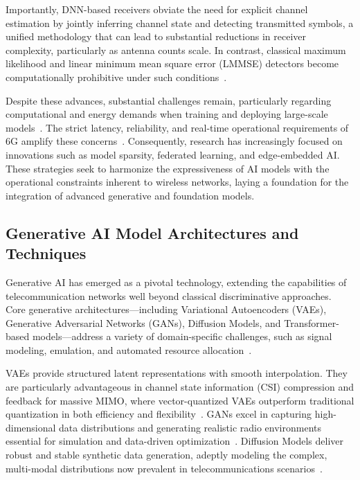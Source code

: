 \documentclass[sigconf]{acmart}
\begin{document}
Importantly, DNN-based receivers obviate the need for explicit channel estimation by jointly inferring channel state and detecting transmitted symbols, a unified methodology that can lead to substantial reductions in receiver complexity, particularly as antenna counts scale. In contrast, classical maximum likelihood and linear minimum mean square error (LMMSE) detectors become computationally prohibitive under such conditions~\cite{ref43}. 

Despite these advances, substantial challenges remain, particularly regarding computational and energy demands when training and deploying large-scale models~\cite{ref49}. The strict latency, reliability, and real-time operational requirements of 6G amplify these concerns~\cite{ref46}. Consequently, research has increasingly focused on innovations such as model sparsity, federated learning, and edge-embedded AI. These strategies seek to harmonize the expressiveness of AI models with the operational constraints inherent to wireless networks, laying a foundation for the integration of advanced generative and foundation models.

\subsection{Generative AI Model Architectures and Techniques}

Generative AI has emerged as a pivotal technology, extending the capabilities of telecommunication networks well beyond classical discriminative approaches. Core generative architectures—including Variational Autoencoders (VAEs), Generative Adversarial Networks (GANs), Diffusion Models, and Transformer-based models—address a variety of domain-specific challenges, such as signal modeling, emulation, and automated resource allocation~\cite{ref1,ref7,ref13,ref21,ref26,ref33,ref44}. 

VAEs provide structured latent representations with smooth interpolation. They are particularly advantageous in channel state information (CSI) compression and feedback for massive MIMO, where vector-quantized VAEs outperform traditional quantization in both efficiency and flexibility~\cite{ref13}. GANs excel in capturing high-dimensional data distributions and generating realistic radio environments essential for simulation and data-driven optimization~\cite{ref1,ref7}. Diffusion Models deliver robust and stable synthetic data generation, adeptly modeling the complex, multi-modal distributions now prevalent in telecommunications scenarios~\cite{ref44}.
\end{document}
